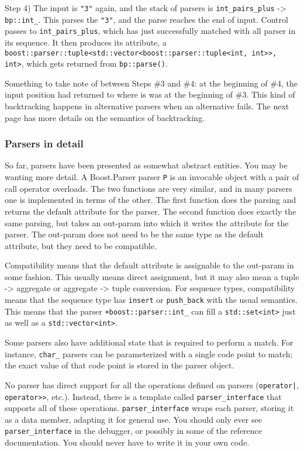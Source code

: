 Step 4) The input is \texttt{"3"} again, and the stack of parsers is \texttt{int\_pairs\_plus} -> \texttt{bp::int\_}. This parses the \texttt{"3"}, and the parse reaches the end of input. Control passes to \texttt{int\_pairs\_plus}, which has just successfully matched with all parser in its sequence. It then produces its attribute, a \texttt{boost::parser::tuple<std::vector<boost::parser::tuple<int, int>>, int>}, which gets returned from \texttt{bp::parse()}.

Something to take note of between Steps \#3 and \#4: at the beginning of \#4, the input position had returned to where is was at the beginning of \#3. This kind of backtracking happens in alternative parsers when an alternative fails. The next page has more details on the semantics of backtracking.

\subsubsection{Parsers in detail}

So far, parsers have been presented as somewhat abstract entities. You may be wanting more detail. A Boost.Parser parser \texttt{P} is an invocable object with a pair of call operator overloads. The two functions are very similar, and in many parsers one is implemented in terms of the other. The first function does the parsing and returns the default attribute for the parser. The second function does exactly the same parsing, but takes an out-param into which it writes the attribute for the parser. The out-param does not need to be the same type as the default attribute, but they need to be compatible.

Compatibility means that the default attribute is assignable to the out-param in some fashion. This usually means direct assignment, but it may also mean a tuple -> aggregate or aggregate -> tuple conversion. For sequence types, compatibility means that the sequence type has \texttt{insert} or \texttt{push\_back} with the usual semantics. This means that the parser \texttt{+boost::parser::int\_} can fill a \texttt{std::set<int>} just as well as a \texttt{std::vector<int>}.

Some parsers also have additional state that is required to perform a match. For instance, \texttt{char\_} parsers can be parameterized with a single code point to match; the exact value of that code point is stored in the parser object.

No parser has direct support for all the operations defined on parsers (\texttt{operator|}, \texttt{operator>>}, etc.). Instead, there is a template called \texttt{parser\_interface} that supports all of these operations. \texttt{parser\_interface} wraps each parser, storing it as a data member, adapting it for general use. You should only ever see \texttt{parser\_interface} in the debugger, or possibly in some of the reference documentation. You should never have to write it in your own code.

